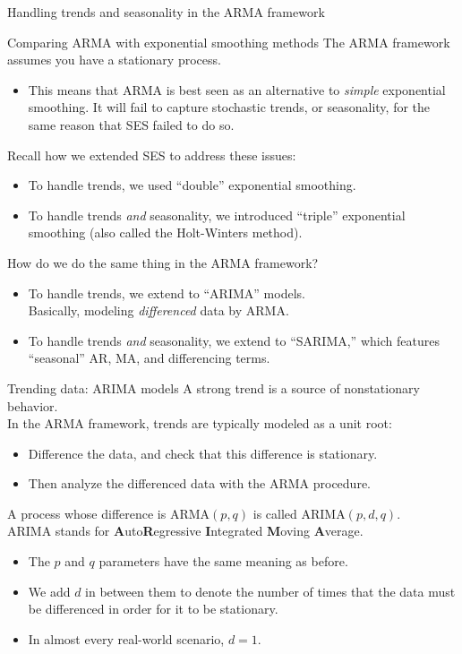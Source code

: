 \documentclass[t,12pt]{beamer}
\begin{document}
\begin{frame}[c]
\vfill
\centerline{Handling trends and seasonality in the ARMA framework}
\vfill
\end{frame}

\begin{frame}[c]{Comparing ARMA with exponential smoothing methods}
The ARMA framework assumes you have a stationary process.
\begin{itemize}
\item This means that ARMA is best seen as an alternative to \emph{simple} exponential smoothing.
It will fail to capture stochastic trends, or seasonality, for the same reason that SES failed to do so.
\end{itemize}
\medskip
Recall how we extended SES to address these issues:
\begin{itemize}
\item To handle trends, we used ``double'' exponential smoothing.
\item To handle trends \emph{and} seasonality, we introduced ``triple'' exponential smoothing (also called the Holt-Winters method).
\end{itemize}
\medskip
How do we do the same thing in the ARMA framework?
\begin{itemize}
\item To handle trends, we extend to ``ARIMA'' models.
\\ Basically, modeling \emph{differenced} data by ARMA.
\item To handle trends \emph{and} seasonality, we extend to ``SARIMA,''
which features ``seasonal'' AR, MA, and differencing terms.
\end{itemize}
\end{frame}

\begin{frame}[c]{Trending data: ARIMA models}
A strong trend is a source of nonstationary behavior.
\\ \bigskip
In the ARMA framework, trends are typically modeled as a unit root:
\begin{itemize}
\item
Difference the data, and check that this difference is stationary.
\item
Then analyze the differenced data with the ARMA procedure.
\end{itemize}
\bigskip
A process whose difference is ARMA$(p,q)$ is called ARIMA$(p,d,q)$.
\\ ARIMA stands for \textbf{A}uto\textbf{R}egressive \textbf{I}ntegrated \textbf{M}oving \textbf{A}verage.
\begin{itemize}
\item
The $p$ and $q$ parameters have the same meaning as before.
\item
We add $d$ in between them to denote the number of times that the data must be differenced in order for it to be stationary.
\item
In almost every real-world scenario, $d=1$.
\end{itemize}
\end{frame}
\end{document}
